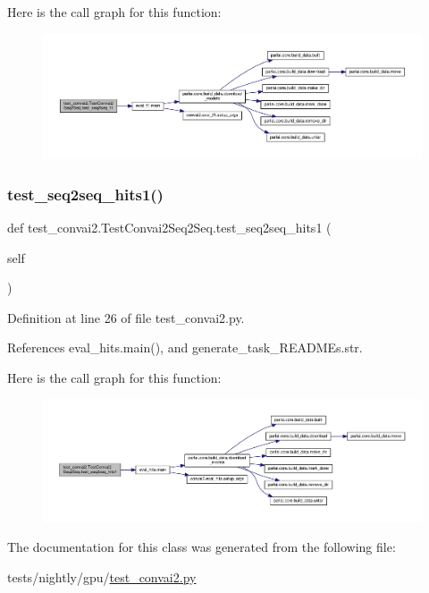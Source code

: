 Here is the call graph for this function\+:
\nopagebreak
\begin{figure}[H]
\begin{center}
\leavevmode
\includegraphics[width=350pt]{classtest__convai2_1_1TestConvai2Seq2Seq_af92bc095f0d62a64388b736f06b003a6_cgraph}
\end{center}
\end{figure}
\mbox{\label{classtest__convai2_1_1TestConvai2Seq2Seq_ae1f1ed9b54523ecf62a983e6d0ae1bb2}} 
\subsubsection{\texorpdfstring{test\+\_\+seq2seq\+\_\+hits1()}{test\_seq2seq\_hits1()}}
{\footnotesize\ttfamily def test\+\_\+convai2.\+Test\+Convai2\+Seq2\+Seq.\+test\+\_\+seq2seq\+\_\+hits1 (\begin{DoxyParamCaption}\item[{}]{self }\end{DoxyParamCaption})}



Definition at line 26 of file test\+\_\+convai2.\+py.



References eval\+\_\+hits.\+main(), and generate\+\_\+task\+\_\+\+R\+E\+A\+D\+M\+Es.\+str.

Here is the call graph for this function\+:
\nopagebreak
\begin{figure}[H]
\begin{center}
\leavevmode
\includegraphics[width=350pt]{classtest__convai2_1_1TestConvai2Seq2Seq_ae1f1ed9b54523ecf62a983e6d0ae1bb2_cgraph}
\end{center}
\end{figure}


The documentation for this class was generated from the following file\+:\begin{DoxyCompactItemize}
\item 
tests/nightly/gpu/\hyperlink{test__convai2_8py}{test\+\_\+convai2.\+py}\end{DoxyCompactItemize}
